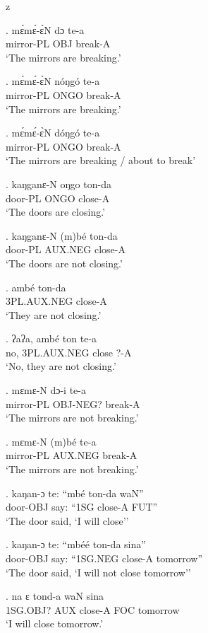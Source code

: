 z   \documentclass{assets/fieldnotes}
\begin{document}
\exg.
mɛ́mɛ́-ɛ̀N     dɔ    te-a    \\
mirror-PL   OBJ   break-A \\%
`The mirrors are breaking.'

\exg.
mɛ́mɛ́-ɛ̀N     nóŋgó   te-a    \\
mirror-PL   ONGO    break-A \\%
`The mirrors are breaking.'

\exg.
mɛ́mɛ́-ɛ̀N     dóŋgó   te-a    \\
mirror-PL   ONGO    break-A \\%
`The mirrors are breaking / about to break'

\exg.
kaŋganɛ-N   oŋgo   ton-da  \\
door-PL     ONGO   close-A \\%
`The doors are closing.'

\exg.
kaŋganɛ-N   (m)bé     ton-da  \\
door-PL     AUX.NEG   close-A \\%
`The doors are not closing.'

\exg.
ambé          ton-da  \\
3PL.AUX.NEG   close-A \\%
`They are not closing.'

\exg.
ʔaʔa,   ambé          ton     te-a \\
no,     3PL.AUX.NEG   close   ?-A  \\%
`No, they are not closing.'

\exg.
mɛmɛ-N      dɔ-i       te-a    \\
mirror-PL   OBJ-NEG?   break-A \\%
`The mirrors are not breaking.'

\exg.
mɛmɛ-N      (m)bé     te-a    \\
mirror-PL   AUX.NEG   break-A \\%
`The mirrors are not breaking.'

\exg.
kaŋan-ɔ    te:    ``mbé   ton-da    waN'' \\
door-OBJ   say:   ``1SG   close-A   FUT'' \\%
`The door said, `I will close''

\exg.
kaŋan-ɔ    te:    ``mbéé      ton-da    sina''     \\
door-OBJ   say:   ``1SG.NEG   close-A   tomorrow'' \\%
`The door said, `I will not close tomorrow''

\exg.
na         ɛ     tond-a    waN   sina     \\
1SG.OBJ?   AUX   close-A   FOC   tomorrow \\%
`I will close tomorrow.' \label{I will close tomorrow}
\end{document}
